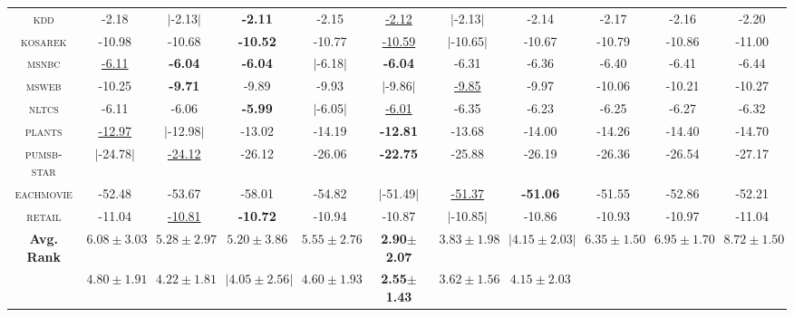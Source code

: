 \begin{table}
{\begin{tabular}{c|ccccc|ccccc}
    \textsc{kdd       } & -2.18 & $|$-2.13$|$ & \textbf{-2.11} & -2.15 & \underline{-2.12} & $|$-2.13$|$ & -2.14 & -2.17 & -2.16 & -2.20\\
    \textsc{kosarek   } & -10.98 & -10.68 & \textbf{-10.52} & -10.77 & \underline{-10.59} & $|$-10.65$|$ & -10.67 & -10.79 & -10.86 & -11.00\\
    \textsc{msnbc     } & \underline{-6.11} & \textbf{-6.04} & \textbf{-6.04} & $|$-6.18$|$ & \textbf{-6.04} & -6.31 & -6.36 & -6.40 & -6.41 & -6.44\\
    \textsc{msweb     } & -10.25 & \textbf{-9.71} & -9.89 & -9.93 & $|$-9.86$|$ & \underline{-9.85} & -9.97 & -10.06 & -10.21 & -10.27\\
    \textsc{nltcs     } & -6.11 & -6.06 & \textbf{-5.99} & $|$-6.05$|$ & \underline{-6.01} & -6.35 & -6.23 & -6.25 & -6.27 & -6.32\\
    \textsc{plants    } & \underline{-12.97} & $|$-12.98$|$ & -13.02 & -14.19 & \textbf{-12.81} & -13.68 & -14.00 & -14.26 & -14.40 & -14.70\\
    \textsc{pumsb-star} & $|$-24.78$|$ & \underline{-24.12} & -26.12 & -26.06 & \textbf{-22.75} & -25.88 & -26.19 & -26.36 & -26.54 & -27.17\\
    \textsc{eachmovie } & -52.48 & -53.67 & -58.01 & -54.82 & $|$-51.49$|$ & \underline{-51.37} & \textbf{-51.06} & -51.55 & -52.86 & -52.21\\
    \textsc{retail    } & -11.04 & \underline{-10.81} & \textbf{-10.72} & -10.94 & -10.87 & $|$-10.85$|$ & -10.86 & -10.93 & -10.97 & -11.04\\
    \hline
    \multirow{2}{*}[-0.15em]{\textbf{Avg. Rank}} & $6.08\pm 3.03$ & $5.28\pm 2.97$ & $5.20\pm 3.86$ & $5.55\pm 2.76$ & \textbf{2.90}$\bm{\pm}$\textbf{2.07} & \underline{$3.83\pm 1.98$} & $|4.15\pm 2.03|$ & $6.35\pm 1.50$ & $6.95\pm 1.70$ & $8.72\pm 1.50$ \\
                                                 & $4.80\pm 1.91$ & $4.22\pm 1.81$ & $|4.05\pm 2.56|$ & $4.60\pm 1.93$ & \textbf{2.55}$\bm{\pm}$\textbf{1.43} & \underline{$3.62\pm 1.56$} & $4.15\pm 2.03$ \\
    \hline
  \end{tabular}
  }

\end{table}
